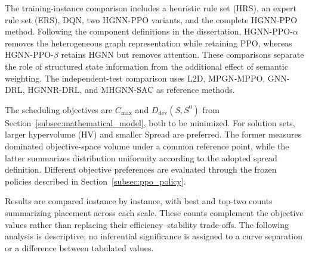 \label{subsec:baselines_metrics}
The training-instance comparison includes a heuristic rule set (HRS), an expert rule set (ERS), DQN,
two HGNN-PPO variants, and the complete HGNN-PPO method. Following the component definitions in the dissertation,
HGNN-PPO-$\alpha$ removes the heterogeneous graph representation while retaining PPO,
whereas HGNN-PPO-$\beta$ retains HGNN but removes attention. These comparisons separate the role
of structured state information from the additional effect of semantic weighting.
The independent-test comparison uses L2D, MPGN-MPPO, GNN-DRL, HGNNR-DRL, and MHGNN-SAC as reference methods.


The scheduling objectives are $C_{\max}$ and $D_{\mathrm{dev}}(S,S^0)$ from Section~\ref{subsec:mathematical_model},
both to be minimized. For solution sets, larger hypervolume (HV) and smaller Spread are preferred.
The former measures dominated objective-space volume under a common reference point,
while the latter summarizes distribution uniformity according to the adopted spread definition.
Different objective preferences are evaluated through the frozen policies described in Section~\ref{subsec:ppo_policy}.


Results are compared instance by instance, with best and top-two counts summarizing placement across each scale.
These counts complement the objective values rather than replacing their efficiency--stability trade-offs.
The following analysis is descriptive; no inferential significance is assigned to a curve separation
or a difference between tabulated values.

